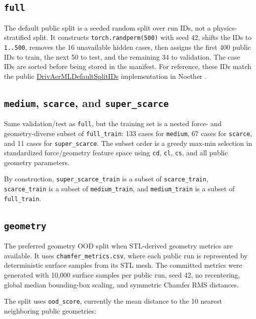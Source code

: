\documentclass[10pt]{article}
\newcommand{\code}[1]{\texttt{#1}}
\newcommand{\splitkey}[1]{\texttt{#1}}
\begin{document}
\subsection*{\splitkey{full}}

The default public split is a seeded random split over run IDs, not a
physics-stratified split. It constructs \code{torch.randperm(500)} with seed
42, shifts the IDs to \code{1..500}, removes the 16 unavailable hidden cases,
then assigns the first 400 public IDs to train, the next 50 to test, and the
remaining 34 to validation. The case IDs are sorted before being stored in the
manifest. For reference, these IDs match the public
\href{https://github.com/Emmi-AI/noether/blob/main/src/noether/data/datasets/cfd/caeml/drivaerml/split.py}{DrivAerMLDefaultSplitIDs}
implementation in Noether \cite{noether_split}.

\subsection*{\splitkey{medium}, \splitkey{scarce}, and \splitkey{super\_scarce}}

Same validation/test as \splitkey{full}, but the training set is a nested
force- and geometry-diverse subset of \splitkey{full\_train}: 133 cases for
\splitkey{medium}, 67 cases for \splitkey{scarce}, and 11 cases for
\splitkey{super\_scarce}. The subset order is a greedy max-min selection in
standardized force/geometry feature space using \code{cd}, \code{cl},
\code{cs}, and all public geometry parameters.

By construction, \splitkey{super\_scarce\_train} is a subset of
\splitkey{scarce\_train}, \splitkey{scarce\_train} is a subset of
\splitkey{medium\_train}, and \splitkey{medium\_train} is a subset of
\splitkey{full\_train}.

\subsection*{\splitkey{geometry}}

The preferred geometry OOD split when STL-derived geometry metrics are
available. It uses \code{chamfer\_metrics.csv}, where each public run is
represented by deterministic surface samples from its STL mesh. The committed
metrics were generated with 10,000 surface samples per public run, seed 42, no
recentering, global median bounding-box scaling, and symmetric Chamfer RMS
distances.

The split uses \code{ood\_score}, currently the mean distance to the 10 nearest
neighboring public geometries:
\end{document}
